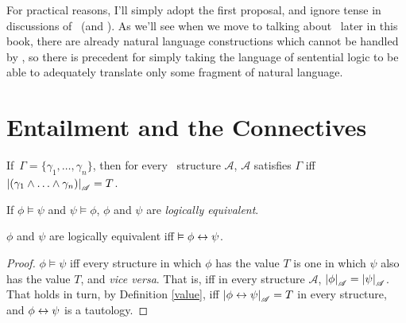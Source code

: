 \begin{itemize}
\end{itemize} For practical reasons, I'll simply adopt the first proposal, and ignore tense in discussions of \lone\ (and \ltwo). As we'll see when we move to talking about \ltwo\ later in this book, there are already natural language constructions which cannot be handled by \lone, so there is precedent for simply taking the language of sentential logic to be able to adequately translate only some fragment of natural language. 


 


 \section{Entailment and the Connectives}
\begin{theorem}
	If\, $\Gamma = \{\gamma_{1},\ldots,\gamma_{n}\}$, then for every \lone\ structure $\mathscr{A}$, $\mathscr{A}$ satisfies $\Gamma$ iff $\left|(\gamma_{1}\wedge\ldots\wedge\gamma_{n})\right|_{\mathscr{A}}=T$.\label{cone}
\end{theorem}

\begin{definition}[Equivalence]
	If $\phi \vDash \psi$ and $\psi\vDash\phi$, $\phi$ and $\psi$ are \emph{logically equivalent}.
\end{definition}
\begin{theorem}	
		$\phi$ and $\psi$ are logically equivalent iff $\vDash \phi \leftrightarrow \psi$.
		\begin{proof}
		$\phi\vDash\psi$ iff every structure in which $\phi$ has the value $T$ is one in which $\psi$ also has the value $T$, and \emph{vice versa}. That is, iff in every structure $\mathscr{A}$, $\left|\phi\right|_{\mathscr{A}}=\left|\psi\right|_{\mathscr{A}}$. That holds in turn, by Definition \ref{value}, iff $\left|\phi\leftrightarrow\psi\right|_{\mathscr{A}}=T$ in every structure, and $\phi\leftrightarrow\psi$ is a tautology.
		\end{proof}
	\end{theorem}		

